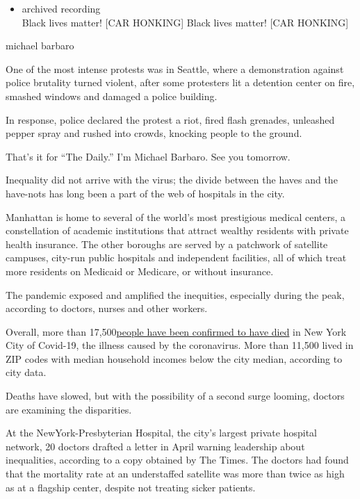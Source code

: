 \begin{itemize}
\tightlist
\item
  archived recording\\
  Black lives matter! {[}CAR HONKING{]} Black lives matter! {[}CAR
  HONKING{]}
\end{itemize}

michael barbaro

One of the most intense protests was in Seattle, where a demonstration
against police brutality turned violent, after some protesters lit a
detention center on fire, smashed windows and damaged a police building.

In response, police declared the protest a riot, fired flash grenades,
unleashed pepper spray and rushed into crowds, knocking people to the
ground.

That's it for ``The Daily.'' I'm Michael Barbaro. See you tomorrow.

Inequality did not arrive with the virus; the divide between the haves
and the have-nots has long been a part of the web of hospitals in the
city.

Manhattan is home to several of the world's most prestigious medical
centers, a constellation of academic institutions that attract wealthy
residents with private health insurance. The other boroughs are served
by a patchwork of satellite campuses, city-run public hospitals and
independent facilities, all of which treat more residents on Medicaid or
Medicare, or without insurance.

The pandemic exposed and amplified the inequities, especially during the
peak, according to doctors, nurses and other workers.

Overall, more than
17,500\href{https://www.nytimes.com/interactive/2020/nyregion/new-york-city-coronavirus-cases.html}{people
have been confirmed to have died} in New York City of Covid-19, the
illness caused by the coronavirus. More than 11,500 lived in ZIP codes
with median household incomes below the city median, according to city
data.

Deaths have slowed, but with the possibility of a second surge looming,
doctors are examining the disparities.

At the NewYork-Presbyterian Hospital, the city's largest private
hospital network, 20 doctors drafted a letter in April warning
leadership about inequalities, according to a copy obtained by The
Times. The doctors had found that the mortality rate at an understaffed
satellite was more than twice as high as at a flagship center, despite
not treating sicker patients.

